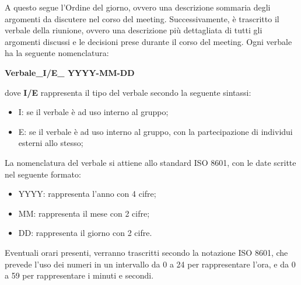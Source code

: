 A questo segue l’Ordine del giorno, ovvero una descrizione sommaria degli argomenti da discutere nel corso del meeting. Successivamente, è trascritto il verbale della riunione, ovvero una descrizione più dettagliata di tutti gli argomenti discussi e le decisioni prese durante il corso del meeting. Ogni verbale ha la seguente nomenclatura:
\begin{center}
\textbf{Verbale\_I/E\_ YYYY-MM-DD}\\
\end{center}
dove \textbf{I/E} rappresenta il tipo del verbale secondo la seguente sintassi:
\begin{itemize}
	\item I: se il verbale è ad uso interno al gruppo;
	\item E: se il verbale è ad uso interno al gruppo, con la partecipazione di individui esterni allo stesso;
\end{itemize}
La nomenclatura del verbale si attiene allo standard ISO 8601, con le date scritte nel seguente formato:
\begin{itemize}
	\item YYYY: rappresenta l’anno con 4 cifre;
	\item MM: rappresenta il mese con 2 cifre;
	\item DD: rappresenta il giorno con 2 cifre.
\end{itemize}

Eventuali orari presenti, verranno trascritti secondo la notazione ISO 8601, che prevede l’uso dei numeri in un intervallo da 0 a 24 per rappresentare l’ora, e da 0 a 59 per rappresentare i minuti e secondi.
